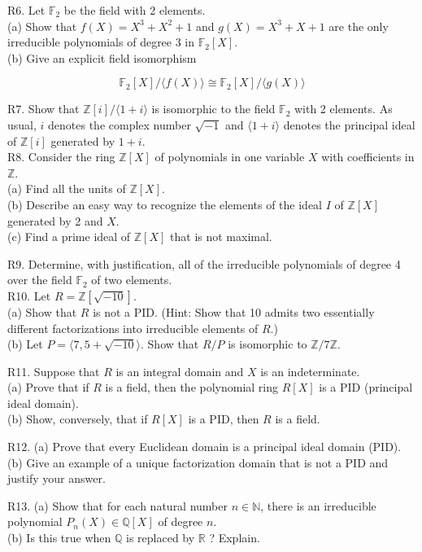 R6. Let $\mathbb{F}_{2}$ be the field with 2 elements.\\
(a) Show that $f(X)=X^{3}+X^{2}+1$ and $g(X)=X^{3}+X+1$ are the only irreducible polynomials of degree 3 in $\mathbb{F}_{2}[X]$.\\
(b) Give an explicit field isomorphism

$$
\mathbb{F}_{2}[X] /\langle f(X)\rangle \cong \mathbb{F}_{2}[X] /\langle g(X)\rangle
$$

R7. Show that $\mathbb{Z}[i] /\langle 1+i\rangle$ is isomorphic to the field $\mathbb{F}_{2}$ with 2 elements. As usual, $i$ denotes the complex number $\sqrt{-1}$ and $\langle 1+i\rangle$ denotes the principal ideal of $\mathbb{Z}[i]$ generated by $1+i$.\\
R8. Consider the ring $\mathbb{Z}[X]$ of polynomials in one variable $X$ with coefficients in $\mathbb{Z}$.\\
(a) Find all the units of $\mathbb{Z}[X]$.\\
(b) Describe an easy way to recognize the elements of the ideal $I$ of $\mathbb{Z}[X]$ generated by 2 and $X$.\\
(c) Find a prime ideal of $\mathbb{Z}[X]$ that is not maximal.

R9. Determine, with justification, all of the irreducible polynomials of degree 4 over the field $\mathbb{F}_{2}$ of two elements.\\
R10. Let $R=\mathbb{Z}[\sqrt{-10}]$.\\
(a) Show that $R$ is not a PID. (Hint: Show that 10 admits two essentially different factorizations into irreducible elements of $R$.)\\
(b) Let $P=\langle 7,5+\sqrt{-10}\rangle$. Show that $R / P$ is isomorphic to $\mathbb{Z} / 7 \mathbb{Z}$.

R11. Suppose that $R$ is an integral domain and $X$ is an indeterminate.\\
(a) Prove that if $R$ is a field, then the polynomial ring $R[X]$ is a PID (principal ideal domain).\\
(b) Show, conversely, that if $R[X]$ is a PID, then $R$ is a field.

R12. (a) Prove that every Euclidean domain is a principal ideal domain (PID).\\
(b) Give an example of a unique factorization domain that is not a PID and justify your answer.

R13. (a) Show that for each natural number $n \in \mathbb{N}$, there is an irreducible polynomial $P_{n}(X) \in \mathbb{Q}[X]$ of degree $n$.\\
(b) Is this true when $\mathbb{Q}$ is replaced by $\mathbb{R}$ ? Explain.

